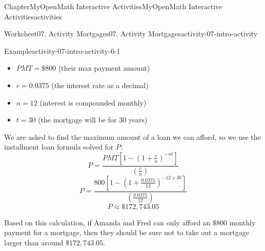\documentclass[oneside,10pt,]{book}
\newcommand{\blocktitlefont}{\relax}
\newcommand{\ptxlistdisc}{\raisebox{0.3ex}{\textbullet}}
\newlength{\fillinmaxwidth}
\newlength{\fillincontract}
\newlength{\charmaxwidth}\setlength{\charmaxwidth}{0.5em}
\newlength{\charminwidth}\setlength{\charminwidth}{0.1em}
\newlength{\fillinheight}
\newcommand{\fillintext}[1]{%
\setlength{\fillinmaxwidth}{#1\charmaxwidth}%
\setlength{\fillincontract}{#1\charminwidth}%
\setlength{\fillinheight}{\baselineskip}\addtolength{\fillinheight}{1.2pt}%
\strut\nobreak\leaders\vbox{\hrule width 0.3pt height 0.3pt \vskip -1.2pt}\hskip 1\fillinmaxwidth minus \fillincontract\nobreak\strut%
}
\begin{document}
\begin{chapterptx}{Chapter}{MyOpenMath Interactive Activities}{}{MyOpenMath Interactive Activities}{}{}{activities}
\begin{worksheet-section}{Worksheet}{07. Activity Mortgages}{}{07. Activity Mortgages}{}{}{activity-07-intro-activity}
\begin{example}{Example}{}{activity-07-intro-activity-6-1}
\begin{itemize}[label=\ptxlistdisc]
\item{}\(PMT = \$800\) (their max payment amount)%
\item{}\(r = 0.0375\) (the interest rate as a decimal)%
\item{}\(n = 12\) (interest is compounded monthly)%
\item{}\(t = 30\) (the mortgage will be for 30 years)%
\end{itemize}
%
\par
We are asked to find the maximum amount of a loan we can afford, so we use the installment loan formula solved for \(P\):%
\begin{equation*}
P = \frac{PMT\left[1 - \left(1 + \frac{r}{n}\right)^{-nt}\right]}{(\frac{r}{n})}
\end{equation*}
%
\begin{equation*}
P = \frac{800\left[1 - \left(1 + \frac{0.0375}{12}\right)^{-12 \times 30}\right]}{(\frac{0.0375}{12})}
\end{equation*}
%
\begin{equation*}
P \approx \$172,743.05
\end{equation*}
%
\par
Based on this calculation, if Amanda and Fred can only afford an \(\$800\) monthly payment for a mortgage, then they should be sure not to take out a mortgage larger than around \(\$172,743.05\).%
\end{example}
%
\end{worksheet-section}
\restoregeometry
%
%
\typeout{************************************************}

\end{chapterptx}
\end{document}
